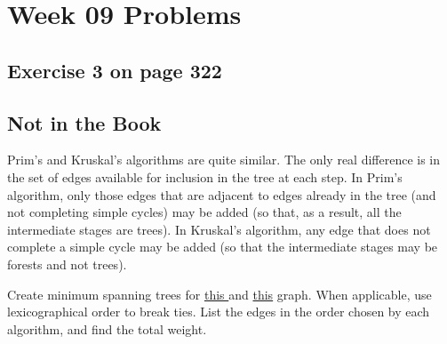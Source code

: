 \documentclass[12pt]{amsart}
\begin{document}
\section{Week 09 Problems}
\subsection{Exercise 3 on page 322}
\subsection{Not in the Book}

  Prim\textquoteright{}s and Kruskal\textquoteright{}s algorithms are quite similar. The only real difference is in the set of edges available for inclusion in the tree at each step. In Prim\textquoteright{}s algorithm, only those edges that are adjacent to edges already in the tree (and not completing simple cycles) may be added (so that, as a result, all the intermediate stages are trees). In Kruskal\textquoteright{}s algorithm, any edge that does not complete a simple cycle may be added (so that the intermediate stages may be forests and not trees). 
  
  Create minimum spanning trees for 
  \href{https://firstthreeodds.org/mstgraphs/mstgraph1.png}{ this } and \href{https://firstthreeodds.org/mstgraphs/mstgraph2.png}{this} graph. When applicable, use lexicographical order to break ties. List the edges in the order chosen by each algorithm, and find the total weight.


  
\end{document}

